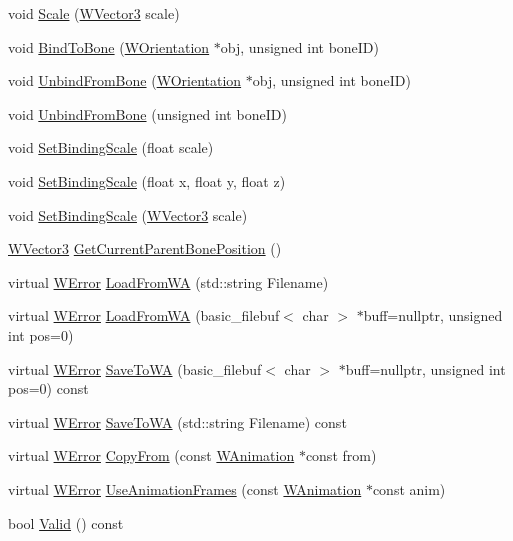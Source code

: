 \begin{DoxyCompactItemize}
\item 
void \hyperlink{class_w_skeleton_a2bf575904565eb1150e6a796de63e07b}{Scale} (\hyperlink{class_w_vector3}{W\+Vector3} scale)
\item 
void \hyperlink{class_w_skeleton_a37e63615cb97bc43113427a17b9419a9}{Bind\+To\+Bone} (\hyperlink{class_w_orientation}{W\+Orientation} $\ast$obj, unsigned int bone\+ID)
\item 
void \hyperlink{class_w_skeleton_a20e053441e09e09039d80ddd23145389}{Unbind\+From\+Bone} (\hyperlink{class_w_orientation}{W\+Orientation} $\ast$obj, unsigned int bone\+ID)
\item 
void \hyperlink{class_w_skeleton_a193daa8bf2f7a7f1231a9c6a0a513aa4}{Unbind\+From\+Bone} (unsigned int bone\+ID)
\item 
void \hyperlink{class_w_skeleton_ad97bb94863e4ff37abdc40710b5ac8e2}{Set\+Binding\+Scale} (float scale)
\item 
void \hyperlink{class_w_skeleton_a58b9feb4fef3ec547a558b13349785a1}{Set\+Binding\+Scale} (float x, float y, float z)
\item 
void \hyperlink{class_w_skeleton_a6bf4fbb06d9670927ed0dd4ba9d1f8a9}{Set\+Binding\+Scale} (\hyperlink{class_w_vector3}{W\+Vector3} scale)
\item 
\hyperlink{class_w_vector3}{W\+Vector3} \hyperlink{class_w_skeleton_a0099df756dc92977203b6917a7e6fb96}{Get\+Current\+Parent\+Bone\+Position} ()
\item 
virtual \hyperlink{class_w_error}{W\+Error} \hyperlink{class_w_skeleton_a3f4cf5fc26481c00b1be94182ff88548}{Load\+From\+WA} (std\+::string Filename)
\item 
virtual \hyperlink{class_w_error}{W\+Error} \hyperlink{class_w_skeleton_a97b90a01212b9cd36481b4f4c6e081d0}{Load\+From\+WA} (basic\+\_\+filebuf$<$ char $>$ $\ast$buff=nullptr, unsigned int pos=0)
\item 
virtual \hyperlink{class_w_error}{W\+Error} \hyperlink{class_w_skeleton_a2330bb6911f771affb31248585fd6b54}{Save\+To\+WA} (basic\+\_\+filebuf$<$ char $>$ $\ast$buff=nullptr, unsigned int pos=0) const 
\item 
virtual \hyperlink{class_w_error}{W\+Error} \hyperlink{class_w_skeleton_aff8cf0e75c84d3fe126e05600e6524cd}{Save\+To\+WA} (std\+::string Filename) const 
\item 
virtual \hyperlink{class_w_error}{W\+Error} \hyperlink{class_w_skeleton_a4560ff9c5033bfad06fb97b99322461a}{Copy\+From} (const \hyperlink{class_w_animation}{W\+Animation} $\ast$const from)
\item 
virtual \hyperlink{class_w_error}{W\+Error} \hyperlink{class_w_skeleton_a8ce00fae07d10e185a9a8cfa64861498}{Use\+Animation\+Frames} (const \hyperlink{class_w_animation}{W\+Animation} $\ast$const anim)
\item 
bool \hyperlink{class_w_skeleton_a65c1f1939b921fd33bc1be39bb89b15e}{Valid} () const 
\end{DoxyCompactItemize}

